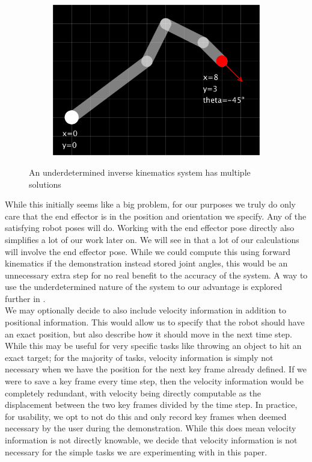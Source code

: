 \begin{figure}[h]
\begin{subfigure}[b]{0.32\textwidth}
        \includegraphics[width=\textwidth]{figures/ik_multi-3.png}
    \end{subfigure}
    \caption{An underdetermined inverse kinematics system has multiple solutions}
    \label{fig:underdetermined}
\end{figure}

While this initially seems like a big problem, for our purposes we truly do only care that the end effector is in the position and orientation we specify. Any of the satisfying robot poses will do. Working with the end effector pose directly also simplifies a lot of our work later on. We will see in  that a lot of our calculations will involve the end effector pose. While we could compute this using forward kinematics if the demonstration instead stored joint angles, this would be an unnecessary extra step for no real benefit to the accuracy of the system. A way to use the underdetermined nature of the system to our advantage is explored further in .\\

We may optionally decide to also include velocity information in addition to positional information. This would allow us to specify that the robot should have an exact position, but also describe how it should move in the next time step. While this may be useful for very specific tasks like throwing an object to hit an exact target; for the majority of tasks, velocity information is simply not necessary when we have the position for the next key frame already defined. If we were to save a key frame every time step, then the velocity information would be completely redundant, with velocity being directly computable as the displacement between the two key frames divided by the time step. In practice, for usability, we opt to not do this and only record key frames when deemed necessary by the user during the demonstration. While this does mean velocity information is not directly knowable, we decide that velocity information is not necessary for the simple tasks we are experimenting with in this paper.\\


